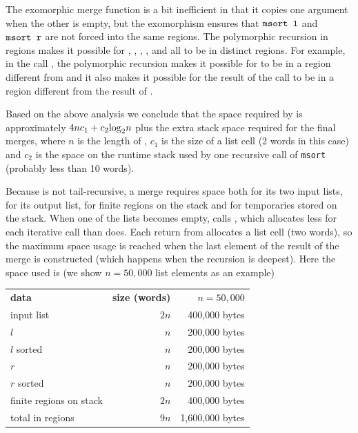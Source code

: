 \documentclass[12pt]{book}
\begin{document}
The exomorphic merge function is a bit inefficient in that it copies
one argument when the other is empty, but the exomorphism ensures that
$\hbox{\tt msort l}$ and $\hbox{\tt msort r}$ are not forced into the same
regions. The polymorphic recursion in regions makes it possible for
, , , , and 
all to be in distinct regions. For example, in the call , the polymorphic recursion makes it possible for  to be
in a region different from  and it also makes it possible for
the result of the call to be in a region different from the result of
.

Based on the above analysis we conclude that the space required by
 is approximately $4nc_1+c_2{\rm log}_2n$ plus the extra
stack space required for the final merges, where $n$ is 
the length of , $c_1$ is the size of a list cell (2 words in this
case) and $c_2$ is the space on the runtime stack used by one recursive call
of {\tt msort} (probably less than 10 words). 

Because  is not tail-recursive, a merge requires space
both for its two input lists, for its output list, for finite regions
on the stack and for temporaries stored on the stack.  When one of the
lists becomes empty,  calls , which allocates
less for each iterative call than  does. Each return from
 allocates a list cell (two words), so the maximum space
usage is reached when the last element of the result of the merge is
constructed (which happens when the recursion is deepest). Here the
space used is (we show $n = 50,000$ list elements as an example)
\begin{center}
\begin{tabular}{lrr}
{\bf data} & {\bf size (words)} &$n=50,000$\\
input list& $2n$ & 400,000 bytes\\
$l$ & $n$ & 200,000 bytes\\
$l$ sorted & $n$ & 200,000 bytes\\
$r$ & $n$ & 200,000 bytes\\
$r$ sorted & $n$ & 200,000 bytes\\
finite regions on stack & $2n$ & 400,000 bytes\\ \hline
total in regions& $9n$ & 1,600,000 bytes
\end{tabular}
\end{center}

\end{document}

